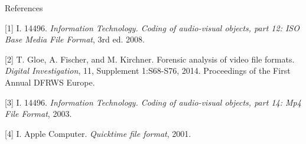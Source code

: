 \begin{tframe}{References}

\begin{footnotesize}

[1] I. 14496. \emph{Information Technology. Coding of audio-visual objects, part 12: ISO Base Media File Format}, 3rd ed. 2008.

\vspace{0.1in}

[2] T. Gloe, A. Fischer, and M. Kirchner. Forensic analysis of video file formats. \emph{Digital Investigation}, 11, Supplement 1:S68-S76, 2014. Proceedings of the First Annual {DFRWS} Europe.

\vspace{0.1in}

[3] I. 14496. \emph{Information Technology. Coding of audio-visual objects, part 14: Mp4 File Format}, 2003.

\vspace{0.1in}

[4] I. Apple Computer. \emph{Quicktime file format}, 2001.

\end{footnotesize}

\end{tframe}
